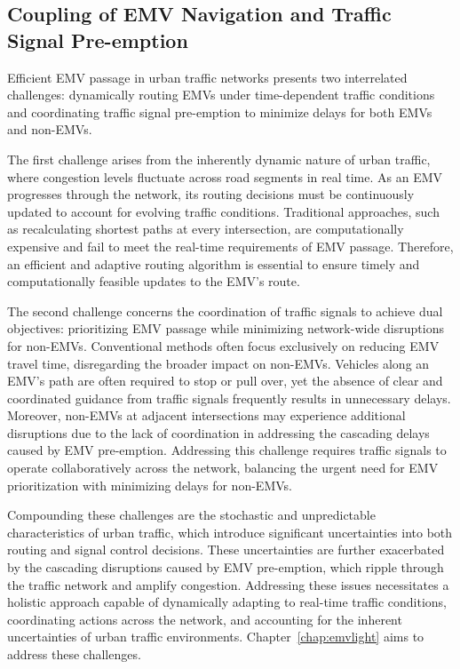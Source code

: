 \subsection{Coupling of EMV Navigation and Traffic Signal Pre-emption}

Efficient EMV passage in urban traffic networks presents two interrelated challenges: dynamically routing EMVs under time-dependent traffic conditions and coordinating traffic signal pre-emption to minimize delays for both EMVs and non-EMVs.

The first challenge arises from the inherently dynamic nature of urban traffic, where congestion levels fluctuate across road segments in real time. As an EMV progresses through the network, its routing decisions must be continuously updated to account for evolving traffic conditions. Traditional approaches, such as recalculating shortest paths at every intersection, are computationally expensive and fail to meet the real-time requirements of EMV passage. Therefore, an efficient and adaptive routing algorithm is essential to ensure timely and computationally feasible updates to the EMV's route.

The second challenge concerns the coordination of traffic signals to achieve dual objectives: prioritizing EMV passage while minimizing network-wide disruptions for non-EMVs. Conventional methods often focus exclusively on reducing EMV travel time, disregarding the broader impact on non-EMVs. Vehicles along an EMV's path are often required to stop or pull over, yet the absence of clear and coordinated guidance from traffic signals frequently results in unnecessary delays. Moreover, non-EMVs at adjacent intersections may experience additional disruptions due to the lack of coordination in addressing the cascading delays caused by EMV pre-emption. Addressing this challenge requires traffic signals to operate collaboratively across the network, balancing the urgent need for EMV prioritization with minimizing delays for non-EMVs.

Compounding these challenges are the stochastic and unpredictable characteristics of urban traffic, which introduce significant uncertainties into both routing and signal control decisions. These uncertainties are further exacerbated by the cascading disruptions caused by EMV pre-emption, which ripple through the traffic network and amplify congestion. Addressing these issues necessitates a holistic approach capable of dynamically adapting to real-time traffic conditions, coordinating actions across the network, and accounting for the inherent uncertainties of urban traffic environments. Chapter~\ref{chap:emvlight} aims to address these challenges.

